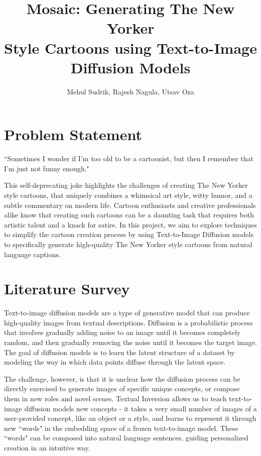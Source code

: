 \documentclass[letterpaper]{article} %
\title{Mosaic: Generating The New Yorker\\ Style Cartoons using Text-to-Image Diffusion Models}
\author{
    Mehul Sudrik,
    Rajesh Nagula,
    Utsav Oza
}
\begin{document}
\maketitle

\section{Problem Statement}

\begin{displayquote}
    ``Sometimes I wonder if I'm too old to be a cartoonist, but then I remember that I'm just not funny enough."
\end{displayquote}
This self-deprecating joke highlights the challenges of creating The New Yorker style cartoons, that uniquely combines a whimsical art style, witty humor, and a subtle commentary on modern life. Cartoon enthusiasts and creative professionals alike know that creating such cartoons can be a daunting task that requires both artistic talent and a knack for satire. In this project, we aim to explore techniques to simplify the cartoon creation process by using Text-to-Image Diffusion models to specifically generate high-quality The New Yorker style cartoons from natural language captions.

\section{Literature Survey}
Text-to-image diffusion models are a type of generative model that can produce high-quality images from textual descriptions. Diffusion \cite{c:21} is a probabilistic process that involves gradually adding noise to an image until it becomes completely random, and then gradually removing the noise until it becomes the target image. The goal of diffusion models is to learn the latent structure of a dataset by modeling the way in which data points diffuse through the latent space.

The challenge, however, is that it is unclear how the diffusion process can be directly exercised to generate images of specific unique concepts, or compose them in new roles and novel scenes. Textual Inversion \cite{c:22} allows us to teach text-to-image diffusion models new concepts - it takes a very small number of images of a user-provided concept, like an object or a style, and learns to represent it through new ``words" in the embedding space of a frozen text-to-image model. These ``words" can be composed into natural language sentences, guiding personalized creation in an intuitive way.
\end{document}
